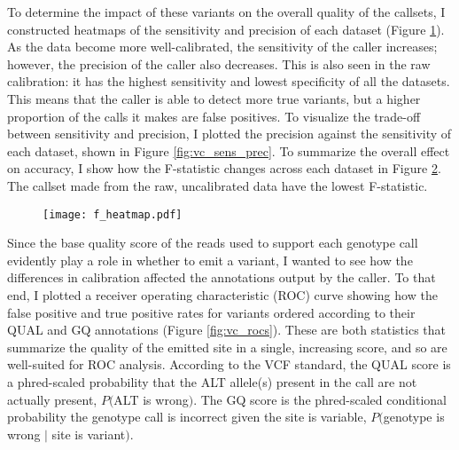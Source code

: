 To determine the impact of these variants on the overall quality of the callsets, I constructed heatmaps of the sensitivity and precision of each dataset (Figure \ref{fig:vc_sens_prech}). As the data become more well-calibrated, the sensitivity of the caller increases; however, the precision of the caller also decreases. This is also seen in the raw calibration: it has the highest sensitivity and lowest specificity of all the datasets. This means that the caller is able to detect more true variants, but a higher proportion of the calls it makes are false positives. To visualize the trade-off between sensitivity and precision, I plotted the precision against the sensitivity of each dataset, shown in Figure \ref{fig:vc_sens_prec}. To summarize the overall effect on accuracy, I show how the F-statistic changes across each dataset in Figure \ref{fig:vc_f_heatmap}. The callset made from the raw, uncalibrated data have the lowest F-statistic.

\begin{figure}
\centering
{}
\label{fig:vc_sens_prech}
\end{figure}

\begin{figure}
\centering
\texttt{[image: f\_heatmap.pdf]}
\label{fig:vc_f_heatmap}
\end{figure}

Since the base quality score of the reads used to support each genotype call evidently play a role in whether to emit a variant, I wanted to see how the differences in calibration affected the annotations output by the caller. To that end, I plotted a receiver operating characteristic (ROC) curve showing how the false positive and true positive rates for variants ordered according to their QUAL and GQ annotations (Figure \ref{fig:vc_rocs}). These are both statistics that summarize the quality of the emitted site in a single, increasing score, and so are well-suited for ROC analysis. According to the VCF standard, the QUAL score is a phred-scaled probability that the ALT allele(s) present in the call are not actually present, $P($ALT is wrong$)$. The GQ score is the phred-scaled conditional probability the genotype call is incorrect given the site is variable, $P($genotype is wrong $|$ site is variant$)$.

